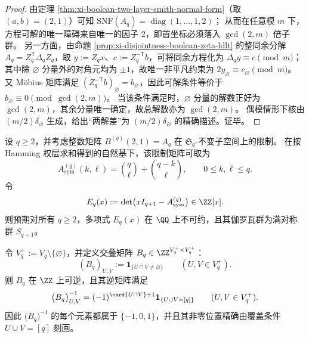 \begin{proof}
由定理 \ref{thm:xi-boolean-two-layer-smith-normal-form}（取 \((a,b)=(2,1)\)）可知
\(
\mathrm{SNF}(A_q)=\operatorname{diag}(1,\dots,1,2)
\)；
从而在任意模 \(m\) 下，方程可解的唯一障碍来自唯一的因子 \(2\)，即首坐标必须落入 \(\gcd(2,m)\) 倍子群。
另一方面，由命题 \ref{prop:xi-disjointness-boolean-zeta-ldlt} 的整同余分解 \(A_q=Z_q^{\mathsf T}\Delta_q Z_q\)，取 \(y:=Z_qx\)、\(c:=Z_q^{-\mathsf T}b\)，可将同余方程化为
\(\Delta_q y\equiv c\pmod m\)；
其中除 \(\varnothing\) 分量外的对角元均为 \(\pm 1\)，故唯一非平凡约束为
\(
2y_{\varnothing}\equiv c_{\varnothing}\pmod m
\)。
又 Möbius 矩阵满足 \((Z_q^{-\mathsf T}b)_{\varnothing}=b_{\varnothing}\)，因此可解条件等价于 \(b_{\varnothing}\equiv 0\pmod{\gcd(2,m)}\)。
当该条件满足时，\(\varnothing\) 分量的解数正好为 \(\gcd(2,m)\)，其余分量唯一确定，故总解数亦为 \(\gcd(2,m)\)。
偶模情形下核由 \((m/2)\delta_{\varnothing}\) 生成，给出“两解差”为 \((m/2)\delta_{\varnothing}\) 的精确描述。证毕。
\end{proof}

\begin{conjecture}\label{conj:xi-boolean-two-layer-symmetric-block-galois}
设 \(q\ge 2\)，并考虑整数矩阵 \(B^{(q)}(2,1)=A_q\) 在 \(\mathfrak S_q\)-不变子空间上的限制。
在按 Hamming 权层求和得到的自然基下，该限制矩阵可取为
\[
A_{\mathrm{sym}}^{(q)}(k,\ell)=\binom{q}{\ell}+\binom{q-k}{\ell},
\qquad 0\le k,\ell\le q.
\]
令
\[
E_q(x):=\det\bigl(xI_{q+1}-A_{\mathrm{sym}}^{(q)}\bigr)\in\ZZ[x].
\]
则预期对所有 \(q\ge 2\)，多项式 \(E_q(x)\) 在 \(\QQ\) 上不可约，且其伽罗瓦群为满对称群 \(S_{q+1}\)。
\end{conjecture}

\begin{proposition}\label{prop:xi-disjointness-boolean-overlap-matrix-inverse}
令 \(V_q^+:=V_q\setminus\{\varnothing\}\)，并定义交叠矩阵 \(B_q\in \ZZ^{V_q^+\times V_q^+}\)：
\[
(B_q)_{U,V}:=\mathbf 1_{\{U\cap V\neq\varnothing\}}\qquad(U,V\in V_q^+).
\]
则 \(B_q\) 在 \(\ZZ\) 上可逆，且其逆矩阵满足
\[
\bigl(B_q\bigr)^{-1}_{U,V}
=(-1)^{\card{U\cap V}+1}\mathbf 1_{\{U\cup V=[q]\}}
\qquad (U,V\in V_q^+).
\]
因此 \(\bigl(B_q\bigr)^{-1}\) 的每个元素都属于 \(\{-1,0,1\}\)，并且其非零位置精确由覆盖条件 \(U\cup V=[q]\) 刻画。
\end{proposition}


